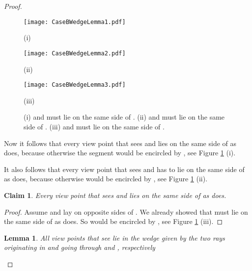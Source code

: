 \documentclass[11pt]{article}
\newtheorem{lemma}{Lemma}
\newtheorem{claim}{Claim}
\begin{document}
\begin{proof}
\begin{figure}[hbtp]\begin{minipage}[t]{0.30\textwidth}
\begin{center}\texttt{[image: CaseBWedgeLemma1.pdf]}

(i)
\end{center}\end{minipage}
\hfill
\begin{minipage}[t]{0.20\textwidth}
\begin{center}\texttt{[image: CaseBWedgeLemma2.pdf]}

(ii)
\end{center}\end{minipage}
\hfill
\begin{minipage}[t]{0.28\textwidth}
\begin{center}\texttt{[image: CaseBWedgeLemma3.pdf]}

(iii)
\end{center}\end{minipage}
\caption{ (i) and  must lie on the same side of .  
(ii)  and  must lie on the same side of .
(iii)  and  must lie on the same side of .}
\label{CaseBWedgeLemma-fig}
\end{figure}


Now it follows that every view point  that sees  and  lies on the same side of  as  does, because otherwise the segment  would be encircled by , see Figure \ref{CaseBWedgeLemma-fig} (i).

It also follows that every view point that sees  and  has to lie on the same side of  as  does, because otherwise  would be encircled by , see Figure \ref{CaseBWedgeLemma-fig} (ii).

\begin{claim} \label{l_1l_2-claim} Every view point  that sees  and  lies on the same side of  as  does. 
\end{claim}

\begin{proof}
Assume  and  lay on opposite sides of  . We already showed that  must lie on the same side of  as  does. So  would be encircled by , see Figure \ref{CaseBWedgeLemma-fig} (iii).
\end{proof}

\begin{lemma}\label{Case1aWedgeSummary} All view points  that see 
lie in the wedge  given by the two rays originating in  and going through  and , respectively
\end{lemma}


\end{proof}
\end{document}
